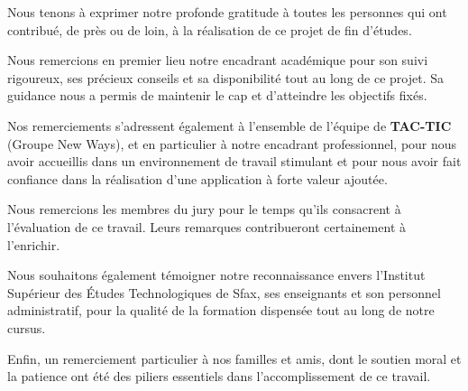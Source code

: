 Nous tenons à exprimer notre profonde gratitude à toutes les personnes qui ont
contribué, de près ou de loin, à la réalisation de ce projet de fin d'études.

Nous remercions en premier lieu notre encadrant académique pour son suivi rigoureux,
ses précieux conseils et sa disponibilité tout au long de ce projet. Sa guidance nous a
permis de maintenir le cap et d'atteindre les objectifs fixés.

Nos remerciements s'adressent également à l'ensemble de l'équipe de \textbf{TAC-TIC}
(Groupe New Ways), et en particulier à notre encadrant professionnel, pour nous avoir
accueillis dans un environnement de travail stimulant et pour nous avoir fait confiance
dans la réalisation d'une application à forte valeur ajoutée.

Nous remercions les membres du jury pour le temps qu'ils consacrent à l'évaluation
de ce travail. Leurs remarques contribueront certainement à l'enrichir.

Nous souhaitons également témoigner notre reconnaissance envers
l'Institut Supérieur des Études Technologiques de Sfax, ses enseignants et son
personnel administratif, pour la qualité de la formation dispensée tout au long de
notre cursus.

Enfin, un remerciement particulier à nos familles et amis, dont le soutien moral
et la patience ont été des piliers essentiels dans l'accomplissement de ce travail.
